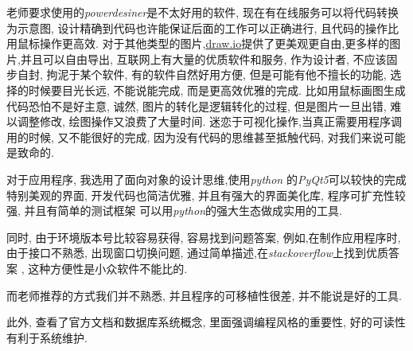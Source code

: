 \documentclass{myreport}
\begin{document}
    老师要求使用的\emph{powerdesiner}是不太好用的软件,
    现在有在线服务可以将代码转换为示意图,
    设计精确到代码也许能保证后面的工作可以正确进行,
    且代码的操作比用鼠标操作更高效.
    对于其他类型的图片,\url{draw.io}提供了更美观更自由,更多样的图片,并且可以自由导出,
    互联网上有大量的优质软件和服务,
    作为设计者, 不应该固步自封, 拘泥于某个软件,
    有的软件自然好用方便, 但是可能有他不擅长的功能,
    选择的时候要目光长远, 不能说能完成,
    而是更高效优雅的完成.
    比如用鼠标画图生成代码恐怕不是好主意,
    诚然, 图片的转化是逻辑转化的过程,
    但是图片一旦出错, 难以调整修改,
    绘图操作又浪费了大量时间.
    迷恋于可视化操作,当真正需要用程序调用的时候,
    又不能很好的完成,
    因为没有代码的思维甚至抵触代码,
    对我们来说可能是致命的.


    对于应用程序, 我选用了面向对象的设计思维,使用\emph{python}
    的\emph{PyQt5}可以较快的完成特别美观的界面,
    开发代码也简洁优雅, 并且有强大的界面美化库,
    程序可扩充性较强,
    并且有简单的测试框架
    可以用\emph{python}的强大生态做成实用的工具.

    同时, 由于环境版本号比较容易获得, 容易找到问题答案,
    例如,在制作应用程序时, 由于接口不熟悉,
    出现窗口切换问题,
    通过简单描述,在\emph{stackoverflow}上找到优质答案
    ,
    这种方便性是小众软件不能比的.

    而老师推荐的方式我们并不熟悉,
    并且程序的可移植性很差,
    并不能说是好的工具.

    此外, 查看了官方文档和数据库系统概念,
    里面强调编程风格的重要性,
    好的可读性有利于系统维护.

\nocite{pipvenv}
\nocite{ali_icon}

\end{document}
